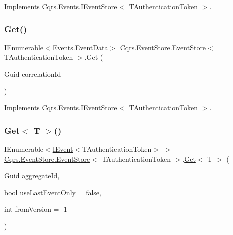 Implements \hyperlink{interfaceCqrs_1_1Events_1_1IEventStore_ae02ef6c804d0c4a92705a447bc4b2214_ae02ef6c804d0c4a92705a447bc4b2214}{Cqrs.\+Events.\+I\+Event\+Store$<$ T\+Authentication\+Token $>$}.

\mbox{\label{classCqrs_1_1EventStore_1_1EventStore_a898b51899af27db8aa0fb0c0dc75b25d_a898b51899af27db8aa0fb0c0dc75b25d}} 
\subsubsection{\texorpdfstring{Get()}{Get()}\hspace{0.1cm}{\footnotesize\ttfamily [2/2]}}
{\footnotesize\ttfamily I\+Enumerable$<$\hyperlink{classCqrs_1_1Events_1_1EventData}{Events.\+Event\+Data}$>$ \hyperlink{classCqrs_1_1EventStore_1_1EventStore}{Cqrs.\+Event\+Store.\+Event\+Store}$<$ T\+Authentication\+Token $>$.Get (\begin{DoxyParamCaption}\item[{Guid}]{correlation\+Id }\end{DoxyParamCaption})}



Implements \hyperlink{interfaceCqrs_1_1Events_1_1IEventStore_af398bb6768fa661ad97a9fa9ecfbd9fb_af398bb6768fa661ad97a9fa9ecfbd9fb}{Cqrs.\+Events.\+I\+Event\+Store$<$ T\+Authentication\+Token $>$}.

\mbox{\label{classCqrs_1_1EventStore_1_1EventStore_aaa4ebd61c84124425380ce31e3a67600_aaa4ebd61c84124425380ce31e3a67600}} 
\subsubsection{\texorpdfstring{Get$<$ T $>$()}{Get< T >()}}
{\footnotesize\ttfamily I\+Enumerable$<$\hyperlink{interfaceCqrs_1_1Events_1_1IEvent}{I\+Event}$<$T\+Authentication\+Token$>$ $>$ \hyperlink{classCqrs_1_1EventStore_1_1EventStore}{Cqrs.\+Event\+Store.\+Event\+Store}$<$ T\+Authentication\+Token $>$.\hyperlink{classCqrs_1_1EventStore_1_1EventStore_a9d7b3a3ebcf110fe02d53e2ada19933d_a9d7b3a3ebcf110fe02d53e2ada19933d}{Get}$<$ T $>$ (\begin{DoxyParamCaption}\item[{Guid}]{aggregate\+Id,  }\item[{bool}]{use\+Last\+Event\+Only = {\ttfamily false},  }\item[{int}]{from\+Version = {\ttfamily -\/1} }\end{DoxyParamCaption})}

